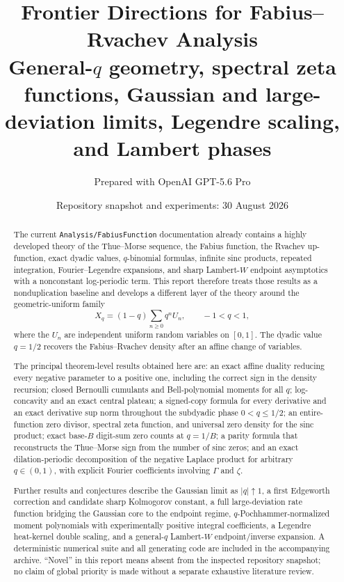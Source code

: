 \documentclass[11pt,oneside]{article}
\title{\bfseries Frontier Directions for Fabius--Rvachev Analysis\\[0.45em]
\large General-$q$ geometry, spectral zeta functions, Gaussian and large-deviation limits, Legendre scaling, and Lambert phases}
\author{Prepared with OpenAI GPT-5.6 Pro}
\date{Repository snapshot and experiments: 30 August 2026}
\theoremstyle{definition}
\theoremstyle{remark}
\newcommand{\repo}{\nolinkurl{Analysis/FabiusFunction}}
\begin{document}
\maketitle

\begin{abstract}
The current \repo{} documentation already contains a highly developed theory of the Thue--Morse sequence, the Fabius function, the Rvachev up-function, exact dyadic values, $q$-binomial formulas, infinite sinc products, repeated integration, Fourier--Legendre expansions, and sharp Lambert-$W$ endpoint asymptotics with a nonconstant log-periodic term.  This report therefore treats those results as a nonduplication baseline and develops a different layer of the theory around the geometric-uniform family
\[
 X_q=(1-q)\sum_{n\ge 0}q^nU_n,\qquad -1<q<1,
\]
where the $U_n$ are independent uniform random variables on $[0,1]$.  The dyadic value $q=1/2$ recovers the Fabius--Rvachev density after an affine change of variables.

The principal theorem-level results obtained here are: an exact affine duality reducing every negative parameter to a positive one, including the correct sign in the density recursion; closed Bernoulli cumulants and Bell-polynomial moments for all $q$; log-concavity and an exact central plateau; a signed-copy formula for every derivative and an exact derivative sup norm throughout the subdyadic phase $0<q\le 1/2$; an entire-function zero divisor, spectral zeta function, and universal zero density for the sinc product; exact base-$B$ digit-sum zero counts at $q=1/B$; a parity formula that reconstructs the Thue--Morse sign from the number of sinc zeros; and an exact dilation-periodic decomposition of the negative Laplace product for arbitrary $q\in(0,1)$, with explicit Fourier coefficients involving $\Gamma$ and $\zeta$.

Further results and conjectures describe the Gaussian limit as $|q|\uparrow1$, a first Edgeworth correction and candidate sharp Kolmogorov constant, a full large-deviation rate function bridging the Gaussian core to the endpoint regime, $q$-Pochhammer-normalized moment polynomials with experimentally positive integral coefficients, a Legendre heat-kernel double scaling, and a general-$q$ Lambert-$W$ endpoint/inverse expansion.  A deterministic numerical suite and all generating code are included in the accompanying archive.  ``Novel'' in this report means absent from the inspected repository snapshot; no claim of global priority is made without a separate exhaustive literature review.
\end{abstract}
\end{document}

